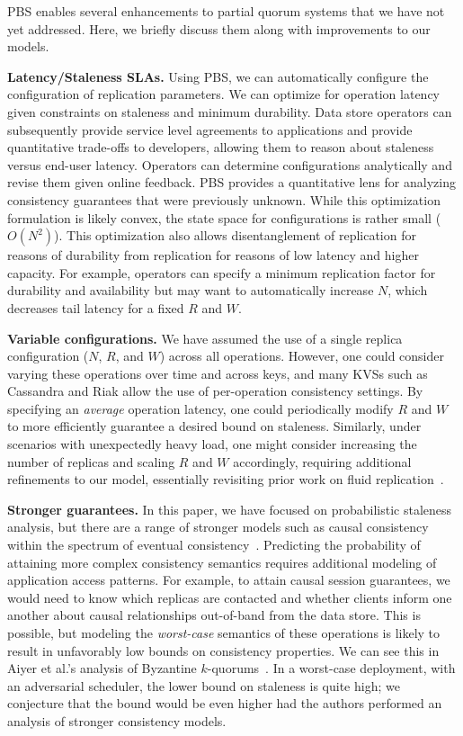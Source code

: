 \documentclass{vldb}
\begin{document}
PBS enables several enhancements to partial quorum systems that we
have not yet addressed.  Here, we briefly discuss them along with
improvements to our models.

\textbf{Latency/Staleness SLAs.} Using PBS, we can automatically
configure the configuration of replication parameters.  We can
optimize for operation latency given constraints on staleness and
minimum durability.  Data store operators can subsequently provide
service level agreements to applications and provide quantitative
trade-offs to developers, allowing them to reason about staleness
versus end-user latency.  Operators can determine configurations
analytically and revise them given online feedback.  PBS provides a
quantitative lens for analyzing consistency guarantees that were
previously unknown.  While this optimization formulation is likely
convex, the state space for configurations is rather small ($O(N^2)$).
This optimization also allows disentanglement of replication for
reasons of durability from replication for reasons of low latency and
higher capacity.  For example, operators can specify a minimum
replication factor for durability and availability but may want to
automatically increase $N$, which decreases tail latency for a fixed
$R$ and $W$.

\textbf{Variable configurations.} We have assumed the use of a single
replica configuration ($N$, $R$, and $W$) across all operations.
However, one could consider varying these operations over time and
across keys, and many KVSs such as Cassandra and Riak allow the use of
per-operation consistency settings.  By specifying an \textit{average}
operation latency, one could periodically modify $R$ and $W$ to more
efficiently guarantee a desired bound on staleness.  Similarly, under
scenarios with unexpectedly heavy load, one might consider increasing
the number of replicas and scaling $R$ and $W$ accordingly, requiring
additional refinements to our model, essentially revisiting prior work
on fluid replication~\cite{fluidreplication}.

\textbf{Stronger guarantees.} In this paper, we have focused on
probabilistic staleness analysis, but there are a range of stronger
models such as causal consistency within the spectrum of eventual
consistency~\cite{vogels-defs}.  Predicting the probability of
attaining more complex consistency semantics requires additional
modeling of application access patterns.  For example, to attain
causal session guarantees, we would need to know which replicas are
contacted and whether clients inform one another about causal
relationships out-of-band from the data store.  This is possible, but
modeling the \textit{worst-case} semantics of these operations is
likely to result in unfavorably low bounds on consistency properties.
We can see this in Aiyer et al.'s analysis of Byzantine
$k$-quorums~\cite{multi-k-quorum}.  In a worst-case deployment, with
an adversarial scheduler, the lower bound on staleness is quite high;
we conjecture that the bound would be even higher had the authors
performed an analysis of stronger consistency models.
\end{document}
